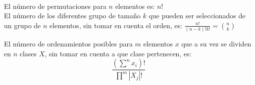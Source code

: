\\[0.1cm]

El número de permutaciones para $n$ elementos es: $n!$\\

El número de los diferentes grupo de tamaño $k$ que pueden ser seleccionados de un grupo de $n$ elementos, sin tomar en cuenta el orden, es: 
$\frac{n!}{(n-k)!k!} = \binom{n}{k}$

El número de ordenamientos posibles para $m$ elementos $x$ que a su vez se dividen en $n$ clases $X$, sin tomar en cuenta a que clase pertenecen, es: 
\begin{equation*}\frac{(\sum^n x_i)!}{\prod^m |X_j|!}\end{equation*}
